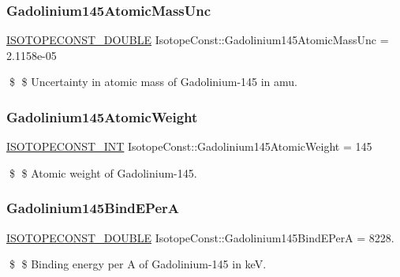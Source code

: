 \subsubsection{\texorpdfstring{Gadolinium145\+Atomic\+Mass\+Unc}{Gadolinium145AtomicMassUnc}}
{\footnotesize\ttfamily \mbox{\hyperlink{group___isotope_const-_macros_ga8f45a7272ce02c0b4c65c44636ed719a}{I\+S\+O\+T\+O\+P\+E\+C\+O\+N\+S\+T\+\_\+\+D\+O\+U\+B\+LE}} Isotope\+Const\+::\+Gadolinium145\+Atomic\+Mass\+Unc = 2.\+1158e-\/05}

\$ \$ Uncertainty in atomic mass of Gadolinium-\/145 in amu. \mbox{\label{group___isotope_const-_gadolinium-_gd145_ga0388a2d6dc9e48e82439a19c601d1786}} 
\subsubsection{\texorpdfstring{Gadolinium145\+Atomic\+Weight}{Gadolinium145AtomicWeight}}
{\footnotesize\ttfamily \mbox{\hyperlink{group___isotope_const-_macros_ga5f18360b3e99483a35c32d789e62621c}{I\+S\+O\+T\+O\+P\+E\+C\+O\+N\+S\+T\+\_\+\+I\+NT}} Isotope\+Const\+::\+Gadolinium145\+Atomic\+Weight = 145}

\$ \$ Atomic weight of Gadolinium-\/145. \mbox{\label{group___isotope_const-_gadolinium-_gd145_ga05230683b6f563109659f189d54a9017}} 
\subsubsection{\texorpdfstring{Gadolinium145\+Bind\+E\+PerA}{Gadolinium145BindEPerA}}
{\footnotesize\ttfamily \mbox{\hyperlink{group___isotope_const-_macros_ga8f45a7272ce02c0b4c65c44636ed719a}{I\+S\+O\+T\+O\+P\+E\+C\+O\+N\+S\+T\+\_\+\+D\+O\+U\+B\+LE}} Isotope\+Const\+::\+Gadolinium145\+Bind\+E\+PerA = 8228.}

\$ \$ Binding energy per A of Gadolinium-\/145 in keV. \mbox{\label{group___isotope_const-_gadolinium-_gd145_gaad4b194b512835af51f9584208f0e3f3}} 
